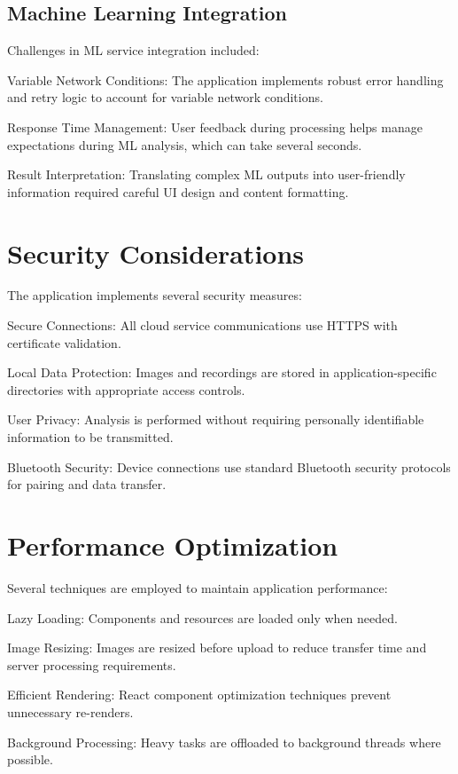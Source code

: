 \subsection{Machine Learning Integration}

Challenges in ML service integration included:

Variable Network Conditions: The application implements robust error handling and retry logic to account for variable network conditions.

Response Time Management: User feedback during processing helps manage expectations during ML analysis, which can take several seconds.

Result Interpretation: Translating complex ML outputs into user-friendly information required careful UI design and content formatting.

\section{Security Considerations}

The application implements several security measures:

Secure Connections: All cloud service communications use HTTPS with certificate validation.

Local Data Protection: Images and recordings are stored in application-specific directories with appropriate access controls.

User Privacy: Analysis is performed without requiring personally identifiable information to be transmitted.

Bluetooth Security: Device connections use standard Bluetooth security protocols for pairing and data transfer.

\section{Performance Optimization}

Several techniques are employed to maintain application performance:

Lazy Loading: Components and resources are loaded only when needed.

Image Resizing: Images are resized before upload to reduce transfer time and server processing requirements.

Efficient Rendering: React component optimization techniques prevent unnecessary re-renders.

Background Processing: Heavy tasks are offloaded to background threads where possible.

